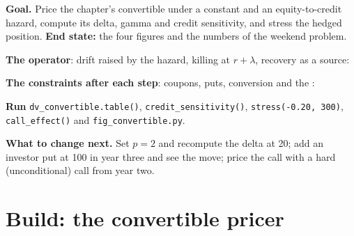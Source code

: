 \begin{tutorial}
\textbf{Goal.} Price the chapter's convertible under a constant and an equity-to-credit hazard, compute its delta, gamma and credit sensitivity,
and stress the hedged position. \textbf{End state:} the four figures and the numbers of the weekend problem.
\begin{tutsteps}
\item \textbf{The operator}: drift raised by the hazard, killing at $r+\lambda$, recovery as a source:
\label{lst:dv:convertibles-and-the-credit-equity-link:operator}
\item \textbf{The constraints after each step}: coupons, puts, conversion and the :
\label{lst:dv:convertibles-and-the-credit-equity-link:constraints}
\item \textbf{Run} \texttt{dv\_convertible.table()}, \texttt{credit\_sensitivity()}, \texttt{stress(-0.20, 300)}, \texttt{call\_effect()} and
\texttt{fig\_convertible.py}.
\end{tutsteps}
\textbf{What to change next.} Set $p=2$ and recompute the delta at 20; add an investor put at 100 in year three and see the  move; price the
call with a hard (unconditional) call from year two.
\end{tutorial}

\section{Build: the convertible pricer}\label{bld:dv:convertibles-and-the-credit-equity-link:convertible}

